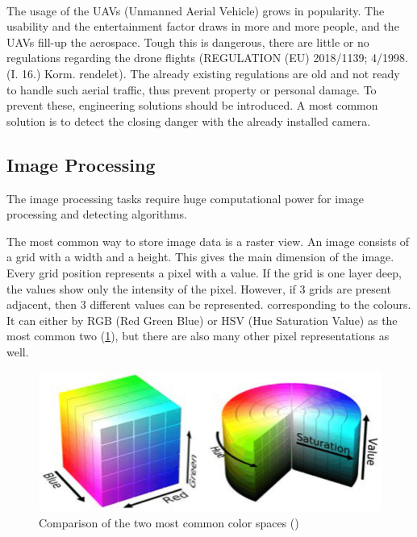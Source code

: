 \paragraph{} %
The usage of the UAVs (Unmanned Aerial Vehicle) grows in popularity.
The usability and the entertainment factor draws in more and more people, and the UAVs fill-up the aerospace.
Tough this is dangerous, there are little or no regulations regarding the drone flights (REGULATION (EU) 2018/1139; 4/1998. (I. 16.) Korm. rendelet).
The already existing regulations are old and not ready to handle such aerial traffic, thus prevent property or personal damage.
To prevent these, engineering solutions should be introduced.
A most common solution is to detect the closing danger with the already installed camera.

\subsection{Image Processing} %
The image processing tasks require huge computational power for image processing and detecting algorithms.

The most common way to store image data is a raster view.
An image consists of a grid with a width and a height.
This gives the main dimension of the image.
Every grid position represents a pixel with a value.
If the grid is one layer deep, the values show only the intensity of the pixel.
However, if 3 grids are present adjacent, then 3 different values can be represented. corresponding to the colours.
It can either by RGB (Red Green Blue) or HSV (Hue Saturation Value) as the most common two (\cref{fig:col_space}), but there are also many other pixel representations as well.

\begin{figure}
    \centering
    \includegraphics[width=\linewidth]{images/RGB-HSV-color-spaces.png}
    \caption{Comparison of the two most common color spaces (\cite{HVS-RGB})}
    \label{fig:col_space}
\end{figure}

